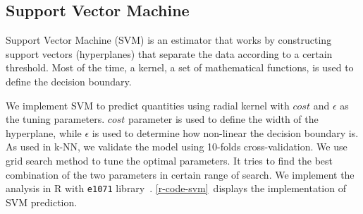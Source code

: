 


	\subsection{Support Vector Machine} %
	\label{sub:support_vector_machine}
	Support Vector Machine (\ac{SVM}) is an estimator that works by constructing support vectors (hyperplanes) that separate the data according to a certain threshold. Most of the time, a kernel, a set of mathematical functions, is used to
	define the decision boundary.

	We implement \ac{SVM} to predict quantities using radial kernel with $cost$ and $\epsilon$ as the tuning parameters.
	$cost$ parameter is used to define the width of the hyperplane, while $\epsilon$ is used to determine how non-linear the decision boundary is.
	As used in \ac{k-NN}, we validate the model using 10-folds cross-validation.
	We use grid search method to tune the optimal parameters. It tries to find the best combination of the two parameters in certain range of search.
	We implement the analysis in R with \verb|e1071| library~\cite{e1071}. \autoref{r-code-svm}~displays the implementation of \ac{SVM} prediction.

